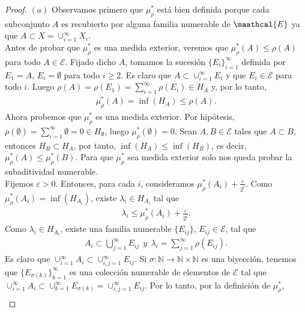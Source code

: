 \begin{proof}
$(a)$ Observamos primero que $\mu_{\rho}^*$ está bien definida porque cada subconjunto $A$ es recubierto por alguna familia numerable de $\maathcal{E}$ ya que $A \subset X = \cup_{i=1}^{\infty}{X_i}$.
\\
\newline
Antes de probar que $\mu_{\rho}^*$ es una medida exterior, veremos que $\mu_{\rho}^*(A) \leq \rho(A)$ para todo $A \in \mathcal{E}$. Fijado dicho $A$, tomamos la sucesión $\{E_i\}_{i=1}^{\infty}$ definida por $E_1 = A$, $E_i = \emptyset$ para todo $i \ge 2$. Es claro que $A \subset \cup_{i=1}^{\infty}{E_i}$ y que $E_i \in \mathcal{E}$ para todo $i$. Luego $\rho(A) = \rho(E_1) = \sum_{i=1}^{\infty}{\rho(E_i)} \in H_A$ y, por lo tanto,
\begin{align*}
    \mu_{\rho}^*(A) = \inf(H_A) \leq \rho(A).
\end{align*}
Ahora probemos que $\mu_{\rho}^*$ es una medida exterior. Por hipótesis, $\rho(\emptyset) = \sum_{i=1}^{\infty}{\emptyset} = 0 \in H_{\emptyset}$, luego $\mu_{\rho}^*(\emptyset) = 0$. Sean $A, B \in \mathcal{E}$ tales que $A \subset B$, entonces $H_B \subset H_A$, por tanto, $\inf(H_A) \leq \inf(H_B)$, es decir, $\mu_{\rho}^*(A) \leq \mu_{\rho}^*(B)$. Para que $\mu_{\rho}^*$ sea medida exterior solo nos queda probar la subaditividad numerable.
\\
\newline
Fijemos $\varepsilon > 0$. Entonces, para cada $i$, consideramos $\mu_{\rho}^*(A_i) + \frac{\varepsilon}{2^i}$. Como $\mu_{\rho}^*(A_i) = \inf(H_{A_i})$, existe $\lambda_i \in H_{A_i}$ tal que
\begin{align*}
    \lambda_i \leq \mu_{\rho}^*(A_i) + \frac{\varepsilon}{2^i}.
\end{align*}
Como $\lambda_i \in H_{A_i}$, existe una familia numerable $\{E_{ij}\}$, $E_{ij} \in \mathcal{E}$, tal que
\begin{align*}
    A_i \subset \bigcup_{j=1}^{\infty}{E_{ij}} \ \ y \ \ \lambda_i = \sum_{j=1}^{\infty}{\rho(E_{ij})}.
\end{align*}
Es claro que $\cup_{i=1}^{\infty}{A_i} \subset \cup_{i,j=1}^{\infty}{E_{ij}}$. Si $\sigma: \mathbb{N} \longrightarrow \mathbb{N} \times \mathbb{N}$ es una biyección, tenemos que $\{E_{\sigma(k)}\}_{k=1}^{\infty}$ es una colección numerable de elementos de $\mathcal{E}$ tal que $\cup_{i=1}^{\infty}{A_i} \subset \cup_{k=1}^{\infty}{E_{\sigma(k)}} = \cup_{i,j=1}^{\infty}{E_{ij}}$. Por lo tanto, por la definición de $\mu_{\rho}^*$,
\begin{align*}

\end{align*}
\end{proof}
